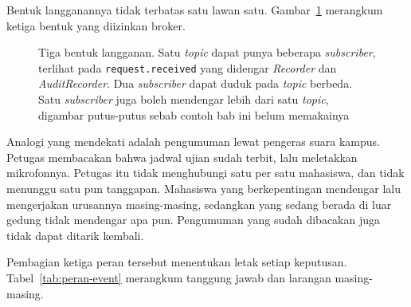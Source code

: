 Bentuk langganannya tidak terbatas satu lawan satu.
Gambar~\ref{fig:bentuk-langganan} merangkum ketiga bentuk yang diizinkan broker.

\begin{figure}[htbp]
  \centering
  \caption{Tiga bentuk langganan. Satu \textit{topic} dapat punya beberapa
    \textit{subscriber}, terlihat pada \texttt{request.received} yang didengar
    \textit{Recorder} dan \textit{AuditRecorder}. Dua \textit{subscriber} dapat
    duduk pada \textit{topic} berbeda. Satu \textit{subscriber} juga boleh
    mendengar lebih dari satu \textit{topic}, digambar putus-putus sebab contoh
    bab ini belum memakainya}
  \label{fig:bentuk-langganan}
\end{figure}

Analogi yang mendekati adalah pengumuman lewat pengeras suara kampus. Petugas
membacakan bahwa jadwal ujian sudah terbit, lalu meletakkan mikrofonnya.
Petugas itu tidak menghubungi satu per satu mahasiswa, dan tidak menunggu
satu pun tanggapan. Mahasiswa yang berkepentingan mendengar lalu mengerjakan
urusannya masing-masing, sedangkan yang sedang berada di luar gedung tidak
mendengar apa pun. Pengumuman yang sudah dibacakan juga tidak dapat ditarik
kembali.

Pembagian ketiga peran tersebut menentukan letak setiap keputusan.
Tabel~\ref{tab:peran-event} merangkum tanggung jawab dan larangan masing-masing.


